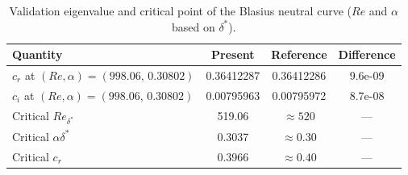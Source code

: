 \begin{table}[htbp]
  \centering
  \caption{Validation eigenvalue and critical point of the Blasius neutral curve ($Re$ and $\alpha$ based on $\delta^*$).}
  \label{tab:os_results}
  \begin{tabular}{lccc}
    \toprule
    Quantity & Present & Reference & Difference \\
    \midrule
    $c_r$ at $(Re,\alpha)=(998.06,\,0.30802)$ & 0.36412287 & 0.36412286 & 9.6e-09 \\
    $c_i$ at $(Re,\alpha)=(998.06,\,0.30802)$ & 0.00795963 & 0.00795972 & 8.7e-08 \\
    \midrule
    Critical $Re_{\delta^*}$ & 519.06 & $\approx 520$ & --- \\
    Critical $\alpha\delta^*$ & 0.3037 & $\approx 0.30$ & --- \\
    Critical $c_r$ & 0.3966 & $\approx 0.40$ & --- \\
    \bottomrule
  \end{tabular}
\end{table}
